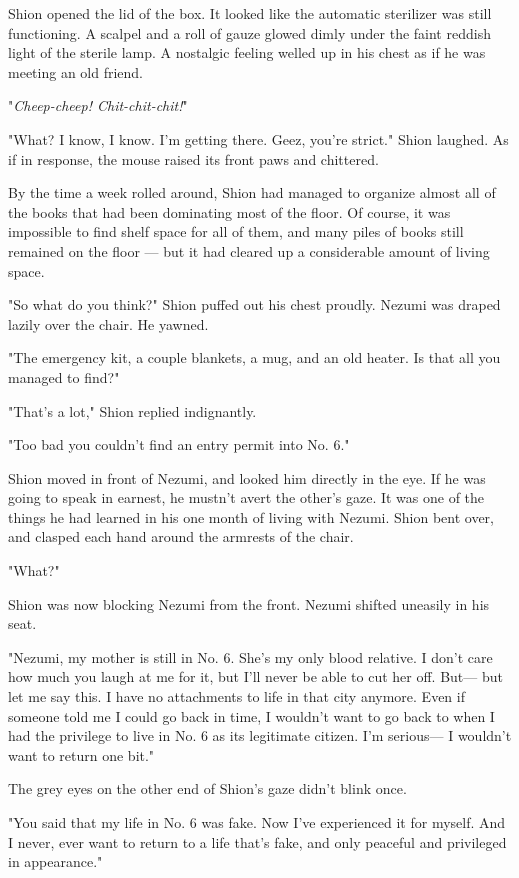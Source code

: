 Shion opened the lid of the box. It looked like the automatic sterilizer
was still functioning. A scalpel and a roll of gauze glowed dimly under
the faint reddish light of the sterile lamp. A nostalgic feeling welled
up in his chest as if he was meeting an old friend.

"\emph{Cheep-cheep! Chit-chit-chit!}"

"What? I know, I know. I'm getting there. Geez, you're strict." Shion
laughed. As if in response, the mouse raised its front paws and
chittered.

\mybreak

By the time a week rolled around, Shion had managed to organize almost
all of the books that had been dominating most of the floor. Of course,
it was impossible to find shelf space for all of them, and many piles of
books still remained on the floor --- but it had cleared up a considerable
amount of living space.

"So what do you think?" Shion puffed out his chest proudly. Nezumi was
draped lazily over the chair. He yawned.

"The emergency kit, a couple blankets, a mug, and an old heater. Is that
all you managed to find?"

"That's a lot," Shion replied indignantly.

"Too bad you couldn't find an entry permit into No. 6."

Shion moved in front of Nezumi, and looked him directly in the eye. If
he was going to speak in earnest, he mustn't avert the other's gaze. It
was one of the things he had learned in his one month of living with
Nezumi. Shion bent over, and clasped each hand around the armrests of
the chair.

"What?"

Shion was now blocking Nezumi from the front. Nezumi shifted uneasily in
his seat.

"Nezumi, my mother is still in No. 6. She's my only blood relative. I
don't care how much you laugh at me for it, but I'll never be able to
cut her off. But--- but let me say this. I have no attachments to life in
that city anymore. Even if someone told me I could go back in time, I
wouldn't want to go back to when I had the privilege to live in No. 6 as
its legitimate citizen. I'm serious--- I wouldn't want to return one bit."

The grey eyes on the other end of Shion's gaze didn't blink once.

"You said that my life in No. 6 was fake. Now I've experienced it for
myself. And I never, ever want to return to a life that's fake, and only
peaceful and privileged in appearance."

